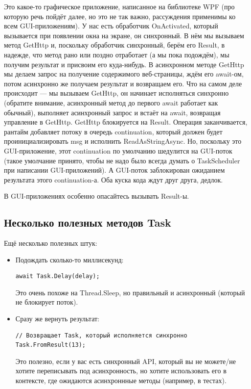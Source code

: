 \documentclass{../../text-style}
\begin{document}
Это какое-то графическое приложение, написанное на библиотеке WPF (про которую речь пойдёт далее, но это не так важно, рассуждения применимы ко всем GUI-приложениям). У нас есть обработчик OnActivated, который вызывается при появлении окна на экране, он синхронный. В нём мы вызываем метод GetHttp и, поскольку обработчик синхронный, берём его Result, в надежде, что метод рано или поздно отработает (а мы пока подождём), мы получим результат и присвоим его куда-нибудь. В асинхронном методе GetHttp мы делаем запрос на получение содержимого веб-страницы, ждём его await-ом, потом асинхронно же получаем результат и возвращаем его. Что на самом деле происходит --- мы вызываем GetHttp, он начинает исполняться синхронно (обратите внимание, асинхронный метод до первого await работает как обычный), выполняет асинхронный запрос и встаёт на await, возвращая управление в GetHttp. GetHttp блокируется на Result. Операция заканчивается, рантайм добавляет потоку в очередь continuation, который должен будет проинициализировать msg и исполнить ReadAsStringAsync. Но, поскольку это GUI-приложение, этот continuation по умолчанию шедулится на GUI-поток (такое умолчание принято, чтобы не надо было всегда думать о TaskScheduler при написании GUI-приложений). А GUI-поток заблокирован ожиданием результата этого continuation-а. Оба куска кода ждут друг друга, дедлок. 

В GUI-приложениях особенно опасайтесь вызывать Result-ы.

\subsection{Несколько полезных методов Task}

Ещё несколько полезных штук:

\begin{itemize}
    \item Подождать сколько-то миллисекунд:
    \begin{verbatim}
await Task.Delay(delay);
    \end{verbatim}
    Это очень похоже на Thread.Sleep, но правильный и асинхронный (который не блокирует поток).

    \item Сразу же вернуть результат:
    \begin{verbatim}
// Возвращает Task, который исполняется синхронно
Task.FromResult(13);
    \end{verbatim}
    Это полезно, если у вас есть синхронный API, который вы не можете/не хотите переписывать под  асинхронность, но хотите использовать его в контексте, где ожидаются асинхроннные методы (например, в тестах).
\end{itemize}
\end{document}
